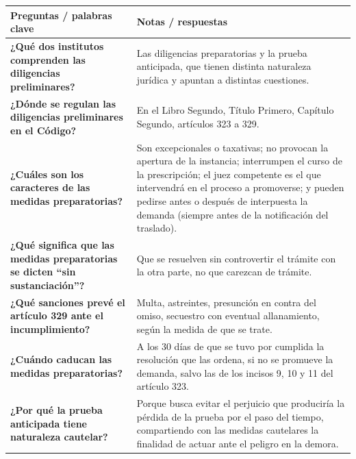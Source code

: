 \documentclass[12pt,oneside]{book}
\begin{document}
\begin{table}[H]
\centering
\small
\renewcommand{\arraystretch}{1.05}
\setlength{\parskip}{0.2em}
\begin{tabularx}{\textwidth}{
    >{\raggedright\arraybackslash}p{}
    >{\raggedright\arraybackslash}X
}
\toprule
\textbf{Preguntas / palabras clave} &
\textbf{Notas / respuestas} \\
\midrule

\textbf{¿Qué dos institutos comprenden las diligencias preliminares?} &
Las diligencias preparatorias y la prueba anticipada, que tienen distinta naturaleza jurídica y apuntan a distintas cuestiones. \\

\textbf{¿Dónde se regulan las diligencias preliminares en el Código?} &
En el Libro Segundo, Título Primero, Capítulo Segundo, artículos 323 a 329. \\

\textbf{¿Cuáles son los caracteres de las medidas preparatorias?} &
Son excepcionales o taxativas; no provocan la apertura de la instancia; interrumpen el curso de la prescripción; el juez competente es el que intervendrá en el proceso a promoverse; y pueden pedirse antes o después de interpuesta la demanda (siempre antes de la notificación del traslado). \\

\textbf{¿Qué significa que las medidas preparatorias se dicten ``sin sustanciación''?} &
Que se resuelven sin controvertir el trámite con la otra parte, no que carezcan de trámite. \\

\textbf{¿Qué sanciones prevé el artículo 329 ante el incumplimiento?} &
Multa, astreintes, presunción en contra del omiso, secuestro con eventual allanamiento, según la medida de que se trate. \\

\textbf{¿Cuándo caducan las medidas preparatorias?} &
A los 30 días de que se tuvo por cumplida la resolución que las ordena, si no se promueve la demanda, salvo las de los incisos 9, 10 y 11 del artículo 323. \\

\textbf{¿Por qué la prueba anticipada tiene naturaleza cautelar?} &
Porque busca evitar el perjuicio que produciría la pérdida de la prueba por el paso del tiempo, compartiendo con las medidas cautelares la finalidad de actuar ante el peligro en la demora. \\


\end{tabularx}
\end{table}
\end{document}
